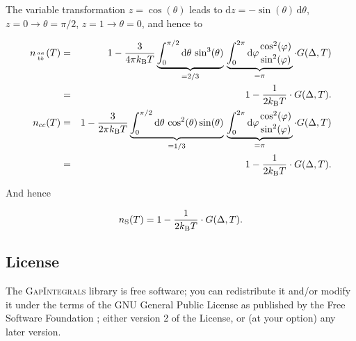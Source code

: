 \documentclass[twoside]{article}
\newcommand{\gapint}{\textsc{GapIntegrals}\xspace}
\begin{document}
\noindent The variable transformation $z = \cos(\theta)$ leads to $\mathrm{d}z = -\sin(\theta)\,\mathrm{d}\theta$, $z=0 \to \theta=\pi/2$, $z=1 \to \theta=0$, and hence to

\begin{eqnarray*}
 n_{aa \atop bb}(T) &=& 1 - \frac{3}{4\pi k_{\rm B} T} \underbrace{\int_0^{\pi/2} \mathrm{d}\theta \, \sin^3(\theta)}_{= 2/3} \, \underbrace{\int_0^{2\pi} \mathrm{d}\varphi {\cos^2(\varphi) \atop \sin^2(\varphi)}}_{=\pi} \cdot G(\Delta, T) \\
 &=& 1 - \frac{1}{2 k_{\rm B} T} \cdot G(\Delta, T). \\
 n_{cc}(T) &=& 1 - \frac{3}{2\pi k_{\rm B} T} \underbrace{\int_0^{\pi/2} \mathrm{d}\theta \, \cos^2(\theta)\sin(\theta)}_{=1/3} \, \underbrace{\int_0^{2\pi} \mathrm{d}\varphi {\cos^2(\varphi) \atop \sin^2(\varphi)}}_{=\pi} \cdot G(\Delta, T) \\
 &=&  1 - \frac{1}{2 k_{\rm B} T} \cdot G(\Delta, T). 
\end{eqnarray*}

\noindent And hence

$$ n_{\rm S}(T) = 1- \frac{1}{2 k_{\rm B} T} \cdot G(\Delta, T). $$

\subsection*{License}
The \gapint library is free software; you can redistribute it and/or modify it under the terms of the GNU General Public License as published by the Free Software Foundation \cite{GPL}; either version 2 of the License, or (at your option) any later version.
\end{document}
